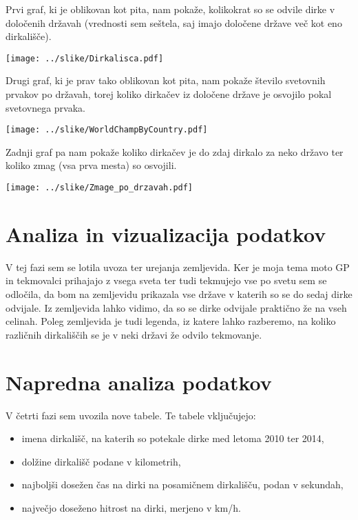 \documentclass[11pt,a4paper]{article}
\begin{document}
\bigskip

Prvi graf, ki je oblikovan kot pita, nam pokaže, kolikokrat so se odvile dirke v določenih državah (vrednosti sem seštela, saj imajo določene države več kot eno dirkališče).

\texttt{[image: ../slike/Dirkalisca.pdf]}

\newpage
Drugi graf, ki je prav tako oblikovan kot pita, nam pokaže število svetovnih prvakov po državah, torej koliko dirkačev iz določene države je osvojilo pokal svetovnega prvaka.

\texttt{[image: ../slike/WorldChampByCountry.pdf]}

\newpage
Zadnji graf pa nam pokaže koliko dirkačev je do zdaj dirkalo za neko državo ter koliko zmag (vsa prva mesta) so osvojili.

\texttt{[image: ../slike/Zmage\_po\_drzavah.pdf]}

\newpage
\section{Analiza in vizualizacija podatkov}

V tej fazi sem se lotila uvoza ter urejanja zemljevida. Ker je moja tema moto GP in tekmovalci prihajajo z vsega sveta ter tudi tekmujejo vse po svetu sem se odločila, da bom na zemljevidu prikazala vse države v katerih so se do sedaj dirke odvijale. Iz zemljevida lahko vidimo, da so se dirke odvijale praktično že na vseh celinah. Poleg zemljevida je tudi legenda, iz katere lahko razberemo, na koliko različnih dirkališčih se je v neki državi že odvilo tekmovanje. 



\section{Napredna analiza podatkov}

V četrti fazi sem uvozila nove tabele. Te tabele vključujejo:
\begin{itemize} 
\item imena dirkališč, na katerih so potekale dirke med letoma 2010 ter 2014,
\item dolžine dirkališč podane v kilometrih,
\item najboljši dosežen čas na dirki na posamičnem dirkališču, podan v sekundah,
\item največjo doseženo hitrost na dirki, merjeno v km/h.
\end{itemize}
\end{document}
